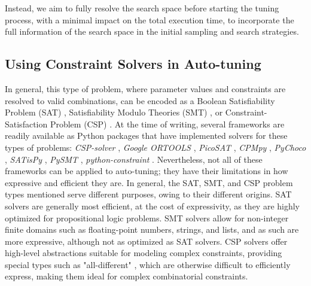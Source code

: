 Instead, we aim to fully resolve the search space before starting the tuning process, with a minimal impact on the total execution time, to incorporate the full information of the search space in the initial sampling and search strategies. 

\subsection{Using Constraint Solvers in Auto-tuning} \label{subsec:searchspace_construction_packages}
In general, this type of problem, where parameter values and constraints are resolved to valid combinations, can be encoded as a Boolean Satisfiability Problem (SAT) \cite{biereHandbookSatisfiabilityVolume2009}, Satisfiability Modulo Theories (SMT) \cite{barrett2008satisfiability}, or Constraint-Satisfaction Problem (CSP) \cite{brailsfordConstraintSatisfactionProblems1999}. At the time of writing, several frameworks are readily available as Python packages that have implemented solvers for these types of problems: \textit{CSP-solver} \cite{maniCSPSolverLibrarySolve}, \textit{Google ORTOOLS} \cite{llcOrtoolsGoogleORTools}, \textit{PicoSAT} \cite{schnellPycosatBindingsPicosat}, \textit{CPMpy} \cite{gunsCPMPy}, \textit{PyChoco} \cite{prudhommePychocoPythonBindings}, \textit{SATisPy} \cite{laszloSatispyInterfaceSAT}, \textit{PySMT} \cite{teamPySMTSolveragnosticLibrary}, \textit{python-constraint} \cite{niemeyerPythonconstraintPythonconstraintModule}. 
Nevertheless, not all of these frameworks can be applied to auto-tuning; they have their limitations in how expressive and efficient they are. In general, the SAT, SMT, and CSP problem types mentioned serve different purposes, owing to their different origins. SAT solvers are generally most efficient, at the cost of expressivity, as they are highly optimized for propositional logic problems. SMT solvers allow for non-integer finite domains such as floating-point numbers, strings, and lists, and as such are more expressive, although not as optimized as SAT solvers. CSP solvers offer high-level abstractions suitable for modeling complex constraints, providing special types such as "all-different" \cite{stojadinovicMeSATMultipleEncodings2014}, which are otherwise difficult to efficiently express, making them ideal for complex combinatorial constraints. 

